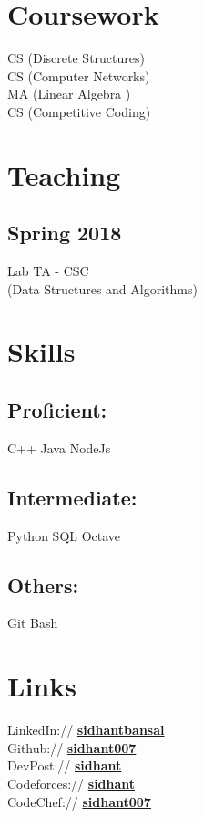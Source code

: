 \documentclass[]{sidhant-resume}
\begin{document}
\begin{minipage}[t]{0.32\textwidth}

\section{Coursework}
CS{} (Discrete Structures) \\
CS{} (Computer Networks) \\
MA{} (Linear Algebra {}) \\
CS{} (Competitive Coding) \\
\section{Teaching}
\subsection{Spring 2018}
Lab TA - CS{}C \\
(Data Structures and Algorithms)
\sectionsep


\section{Skills}
\subsection{Proficient:}
C++ \textbullet{} Java \textbullet{} NodeJs
\sectionsep
\subsection{Intermediate:}
Python \textbullet{}  SQL \textbullet{} Octave
\sectionsep
\subsection{Others:}
Git \textbullet{} Bash
\sectionsep


\section{Links} 
LinkedIn://  \href{https://in.linkedin.com/in/sidhant-bansal}{\bf sidhantbansal} \\
Github:// \href{https://github.com/sidhant007}{\bf sidhant007} \\
DevPost:// \href{https://devpost.com/Sidhant}{\bf sidhant} \\
Codeforces:// \href{http://codeforces.com/profile/sidhant}{\bf sidhant} \\
CodeChef:// \href{https://www.codechef.com/users/sidhant007}{\bf sidhant007} \\

%
%

\end{minipage} 
\end{document}
